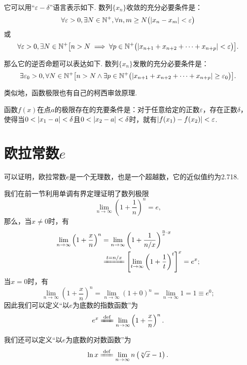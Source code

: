 它可以用“\(\varepsilon-\delta\)”语言表示如下.
数列\(\{x_n\}\)收敛的充分必要条件是：\[
\forall\varepsilon>0,
\exists N\in\mathbb{N}^+,
\forall n,m \geq N
\bigl(
	\abs{x_n-x_m}<\varepsilon
\bigr)
\]或\[
\forall\varepsilon>0,
\exists N\in\mathbb{N}^+
\bigl[
	n>N
	\implies
	\forall p\in\mathbb{N}^+
	\bigl(
		\abs{x_{n+1} + x_{n+2} + \dotsb + x_{n+p}} < \varepsilon
	\bigr)
\bigr].
\]

那么它的逆否命题可以表达如下.
数列\(\{x_n\}\)发散的充分必要条件是：\[
\exists\varepsilon_0>0,\forall N\in\mathbb{N}^+ \bigl[
	n > N
	\land
	\exists p\in\mathbb{N}^+ \bigl(
		\abs{x_{n+1} + x_{n+2} + \dotsb + x_{n+p}} \geq \varepsilon_0
	\bigr)
\bigr].
\]

类似地，函数极限也有自己的柯西审敛原理.
\begin{theorem}\label{theorem:极限.函数的柯西极限存在准则}
函数\(f(x)\)在点\(a\)的极限存在的充要条件是：对于任意给定的正数\(\varepsilon\)，存在正数\(\delta\)，使得当\(0 < \abs{x_1 - a} < \delta\)且\(0 < \abs{x_2 - a} < \delta\)时，就有\(\abs{f(x_1) - f(x_2)} < \varepsilon\).
\end{theorem}

\section{欧拉常数\texorpdfstring{\(e\)}{e}}
可以证明，欧拉常数\(e\)是一个无理数，也是一个超越数，它的近似值约为2.718.

我们在前一节利用单调有界定理证明了数列极限\[
\lim\limits_{n\to\infty} \left(1+\frac{1}{n}\right)^n = e,
\]
那么，当\(x\neq0\)时，有
\begin{align*}
\lim\limits_{n\to\infty} \left(1+\frac{x}{n}\right)^n
&= \lim\limits_{n\to\infty} \left(1+\frac{1}{n/x}\right)^{\frac{n}{x} \cdot x} \\
&\xlongequal{t=n/x} \left[ \lim\limits_{t\to\infty} \left(1+\frac{1}{t}\right)^t \right]^x
= e^x;
\end{align*}
当\(x=0\)时，有\[
\lim\limits_{n\to\infty} \left(1+\frac{x}{n}\right)^n
= \lim\limits_{n\to\infty} (1+0)^n
= \lim\limits_{n\to\infty} 1
= 1 \equiv e^0;
\]
因此我们可以定义“以\(e\)为底数的指数函数”为
\begin{equation}\label{equation:特殊函数.以e为底数的指数函数的极限定义}
e^x
\defeq
\lim\limits_{n\to\infty} \left(1+\frac{x}{n}\right)^n.
\end{equation}

我们还可以定义“以\(e\)为底数的对数函数”为
\begin{equation}\label{equation:特殊函数.以e为底数的对数函数的极限定义}
\ln x
\defeq
\lim\limits_{n\to\infty} n \left( \sqrt[n]{x} - 1 \right).
\end{equation}

